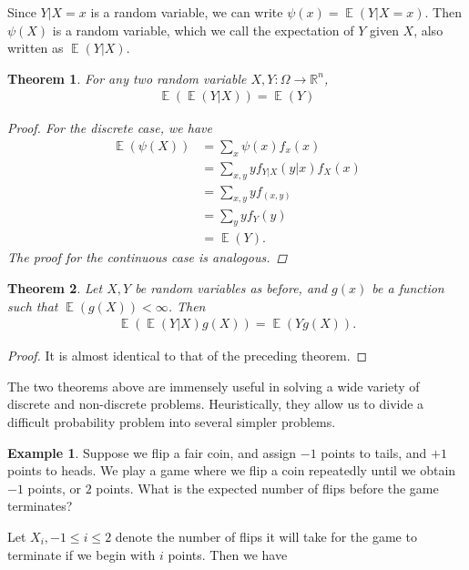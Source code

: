 \documentclass[12pt]{amsbook}
\newcommand{\rr}{\mathbb{R}}
\DeclareMathOperator{\ex}{\mathbb{E}}
\theoremstyle{plain}
\newtheorem{theorem}{Theorem}
\theoremstyle{definition}
\newtheorem*{example}{Example}
\theoremstyle{remark}
\numberwithin{equation}{section}  %
\begin{document}
	Since $Y|X =x$ is a random variable, we can write $\psi(x) = \ex(Y | X =x)$.
	Then $\psi(X)$ is a random variable, which we call the expectation of $Y$ given
	$X$, also written as $\ex(Y|X)$.
	\begin{theorem}
		For any two random variable $X,Y: \Omega \to \rr^n$,
		\begin{align*}
			\ex(\ex(Y | X)) = \ex(Y)
		\end{align*}
		\begin{proof}
			For the discrete case, we have
			\begin{align*}
				\ex(\psi(X)) 
				& = \sum_{x} \psi(x) f_x(x)
				\\
				& = \sum_{x,y} y f_{Y|X}(y|x) f_X(x)
				\\
				& = \sum_{x,y} y f_{(x,y)}
				\\
				& = \sum_y y f_Y(y)
				\\
				& = \ex(Y).
			\end{align*}
			The proof for the continuous case is analogous. 
		\end{proof}
	\end{theorem}
	\begin{theorem}
		Let $X,Y$ be random variables as before, and $g(x)$ be a function such that
		$\ex(g(X))< \infty$. Then
		\begin{align*}
			\ex(\ex(Y|X)g(X)) = \ex(Yg(X)).
		\end{align*}
	\end{theorem}
	\begin{proof}
		It is almost identical to that of the preceding theorem.
	\end{proof}
	The two theorems above are immensely useful in solving a wide variety of
	discrete and non-discrete problems. Heuristically, they allow us to divide a
	difficult probability problem into several simpler problems.
	\begin{example}
		Suppose we flip a fair coin, and assign $-1$ points to tails, and $+1$ 
		points to
		heads. We play a game where we flip a coin repeatedly until we obtain
		$-1$ points, or $2$ points. What is the expected number of flips before the
		game terminates? 
	\end{example}
	Let $X_i, -1 \le i \le 2$ denote the number of flips it will take for the game
	to terminate if we begin with $i$ points. Then we have
\end{document}
